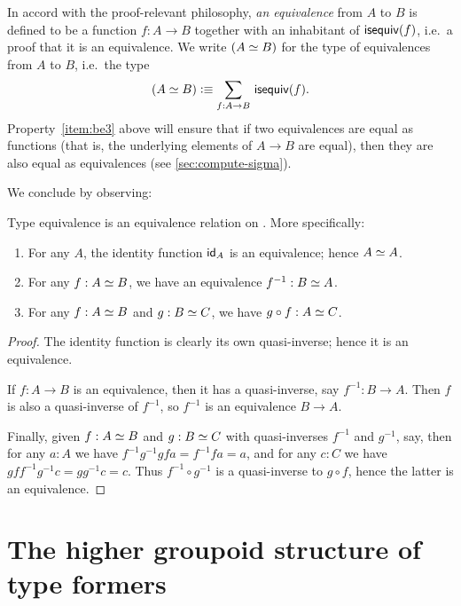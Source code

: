 In accord with the proof-relevant philosophy,
%
\emph{an equivalence} from $A$ to $B$ is defined to be a function $f:A\to B$ together with an inhabitant of $\isequiv (f)$, i.e.\ a proof that it is an equivalence.
We write $(\eqv A B)$ for the type of equivalences from $A$ to $B$, i.e.\ the type
\begin{equation}\label{eq:eqv}
  (\eqv A B) \defeq \sm{f:A\to B} \isequiv(f).
\end{equation}
Property~\ref{item:be3} above will ensure that if two equivalences are equal as functions (that is, the underlying elements of $A\to B$ are equal), then they are also equal as equivalences (see \autoref{sec:compute-sigma}).

We conclude by observing:

\begin{lem}\label{thm:equiv-eqrel}
  Type equivalence is an equivalence relation on \type.
  More specifically:
  \begin{enumerate}
  \item For any $A$, the identity function $\idfunc[A]$ is an equivalence; hence $\eqv A A$.
  \item For any $f:\eqv A B$, we have an equivalence $f^{-1} : \eqv B A$.
  \item For any $f:\eqv A B$ and $g:\eqv B C$, we have $g\circ f : \eqv A C$.
  \end{enumerate}
\end{lem}
\begin{proof}
  The identity function is clearly its own quasi-inverse; hence it is an equivalence.

  If $f:A\to B$ is an equivalence, then it has a quasi-inverse, say $f^{-1}:B\to A$.
  Then $f$ is also a quasi-inverse of $f^{-1}$, so $f^{-1}$ is an equivalence $B\to A$.

  Finally, given $f:\eqv A B$ and $g:\eqv B C$ with quasi-inverses $f^{-1}$ and $g^{-1}$, say, then for any $a:A$ we have $f^{-1} g^{-1} g f a = f^{-1} f a = a$, and for any $c:C$ we have $g f f^{-1} g^{-1} c = g g^{-1} c = c$.
  Thus $f^{-1} \circ g^{-1}$ is a quasi-inverse to $g\circ f$, hence the latter is an equivalence.
\end{proof}

%


\section{The higher groupoid structure of type formers}
\label{sec:computational}

